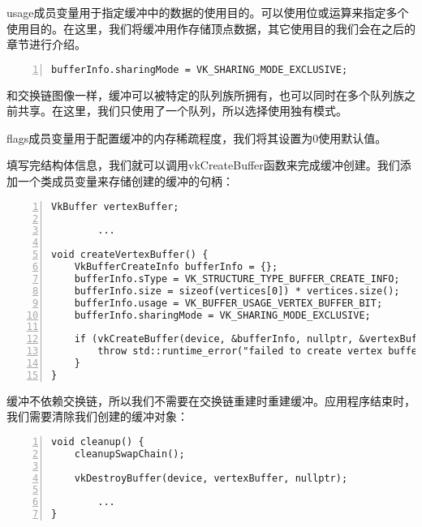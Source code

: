 \documentclass{ctexart}
\begin{document}
usage成员变量用于指定缓冲中的数据的使用目的。可以使用位或运算来指定多个使用目的。在这里，我们将缓冲用作存储顶点数据，其它使用目的我们会在之后的章节进行介绍。

\begin{lstlisting}[language={[ANSI]C},keywordstyle=\color{blue!70},commentstyle=\color{red!50!green!50!blue!50},frame=shadowbox, rulesepcolor=\color{red!20!green!20!blue!20},basicstyle=\small,numbers=left, numberstyle=\tiny,breaklines=true]
bufferInfo.sharingMode = VK_SHARING_MODE_EXCLUSIVE;
\end{lstlisting}

和交换链图像一样，缓冲可以被特定的队列族所拥有，也可以同时在多个队列族之前共享。在这里，我们只使用了一个队列，所以选择使用独有模式。

flags成员变量用于配置缓冲的内存稀疏程度，我们将其设置为0使用默认值。

填写完结构体信息，我们就可以调用vkCreateBuffer函数来完成缓冲创建。我们添加一个类成员变量来存储创建的缓冲的句柄：

\begin{lstlisting}[language={[ANSI]C},keywordstyle=\color{blue!70},commentstyle=\color{red!50!green!50!blue!50},frame=shadowbox, rulesepcolor=\color{red!20!green!20!blue!20},basicstyle=\small,numbers=left, numberstyle=\tiny,breaklines=true]
VkBuffer vertexBuffer;

		...

void createVertexBuffer() {
	VkBufferCreateInfo bufferInfo = {};
	bufferInfo.sType = VK_STRUCTURE_TYPE_BUFFER_CREATE_INFO;
	bufferInfo.size = sizeof(vertices[0]) * vertices.size();
	bufferInfo.usage = VK_BUFFER_USAGE_VERTEX_BUFFER_BIT;
	bufferInfo.sharingMode = VK_SHARING_MODE_EXCLUSIVE;

	if (vkCreateBuffer(device, &bufferInfo, nullptr, &vertexBuffer) != VK_SUCCESS) {
		throw std::runtime_error("failed to create vertex buffer!");
	}
}
\end{lstlisting}

缓冲不依赖交换链，所以我们不需要在交换链重建时重建缓冲。应用程序结束时，我们需要清除我们创建的缓冲对象：

\begin{lstlisting}[language={[ANSI]C},keywordstyle=\color{blue!70},commentstyle=\color{red!50!green!50!blue!50},frame=shadowbox, rulesepcolor=\color{red!20!green!20!blue!20},basicstyle=\small,numbers=left, numberstyle=\tiny,breaklines=true]
void cleanup() {
	cleanupSwapChain();

	vkDestroyBuffer(device, vertexBuffer, nullptr);

		...
}
\end{lstlisting}
\end{document}
